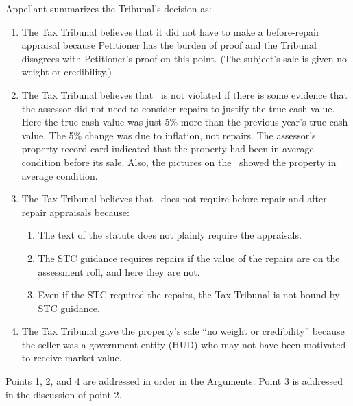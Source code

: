 \documentclass[12pt,\documentclassflag]{michiganCourtOfAppealsBrief}
\begin{document}
Appellant summarizes the Tribunal's decision as:

\begin{enumerate}
  
\item The Tax Tribunal believes that it did not have to make a before-repair appraisal because Petitioner has the burden of proof and the Tribunal disagrees with Petitioner's proof on this point. (The subject's sale is given no weight or credibility.)
  
\item The Tax Tribunal believes that \mathieuGast\ is not violated if there is some evidence that the assessor did not need to consider repairs to justify the true cash value. Here the true cash value was just 5\% more than the previous year's true cash value. The 5\% change was due to inflation, not repairs. The assessor's property record card indicated that the property had been in average condition before its sale. Also, the pictures on the \MLS\ showed the property in average condition.
  
\item The Tax Tribunal believes that \mathieuGast\ does not require before-repair and after-repair appraisals because:
  \begin{enumerate}
  \item The text of the statute does not plainly require the appraisals.
  \item The STC guidance requires repairs if the value of the repairs are on the assessment roll, and here they are not.
  \item Even if the STC required the repairs, the Tax Tribunal is not bound by STC guidance.
  \end{enumerate}

\item The Tax Tribunal gave the property's sale ``no weight or credibility'' because the seller was a government entity (HUD) who may not have been motivated to receive market value.
  
\end{enumerate}

Points 1, 2, and 4 are addressed in order in the Arguments. Point 3 is addressed in the discussion of point 2.  


	
\end{document}
